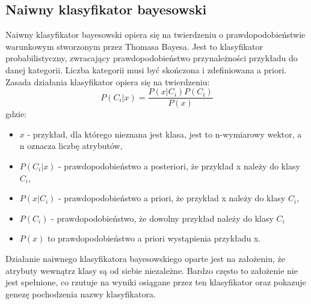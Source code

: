 \subsection{Naiwny klasyfikator bayesowski}
Naiwny klasyfikator bayesowski opiera się na twierdzeniu o prawdopodobieństwie warunkowym stworzonym przez Thomasa Bayesa. Jest to klasyfikator probabilistyczny, zwracający prawdopodobieństwo przynależności przykładu do danej kategorii. Liczba kategorii musi być skończona i zdefiniowana a priori. Zasada działania klasyfikator opiera się na twierdzeniu:
\[P(C_i|x) = \frac{P(x|C_i)P(C_i)}{P(x)}\]
gdzie:
\begin{itemize}
	\item $x$ - przykład, dla którego nieznana jest klasa, jest to n-wymiarowy wektor, a n oznacza liczbę atrybutów,  
	\item $P(C_i|x)$ - prawdopodobieństwo a posteriori, że przykład x należy do klasy $C_i$,
	\item $P(x|C_i)$ - prawdopodobieństwo a priori, że przykład x należy do klasy $C_i$,
	\item $P(C_i)$ - prawdopodobieństwo, że dowolny przykład należy do klasy $C_i$
	\item $P(x)$ to prawdopodobieństwo a priori wystąpienia przykładu x.
\end{itemize}
Działanie naiwnego klasyfikatora bayesowskiego oparte jest na założeniu, że atrybuty wewnątrz klasy są od siebie niezależne. Bardzo często to założenie nie jest spełnione, co rzutuje na wyniki osiągane przez ten klasyfikator oraz pokazuje genezę pochodzenia nazwy klasyfikatora.

